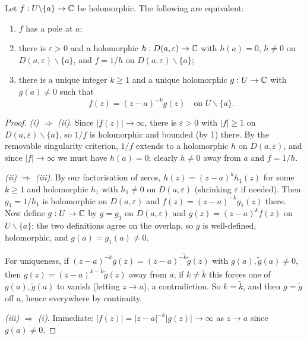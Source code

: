 \documentclass[a4paper]{scrartcl}
\begin{document}
\begin{proposition}
    Let $f: U \backslash \{a\} \rightarrow \mathbb{C}$ be holomorphic. The following are equivalent:
    \begin{enumerate}[label=(\roman*)]
        \item $f$ has a pole at $a$;
        \item there is $\varepsilon > 0$ and a holomorphic $h: D(a, \varepsilon) \rightarrow \mathbb{C}$ with $h(a) = 0$, $h \neq 0$ on $D(a, \varepsilon) \backslash \{a\}$, and $f = 1/h$ on $D(a, \varepsilon) \backslash \{a\}$;
        \item there is a unique integer $k \geq 1$ and a unique holomorphic $g: U \rightarrow \mathbb{C}$ with $g(a) \neq 0$ such that
        $$
        f(z) = (z - a)^{-k} g(z) \quad \text{on } U \backslash \{a\}.
        $$
    \end{enumerate}
\end{proposition}
\begin{proof}
    \emph{(i) $\Rightarrow$ (ii)}. Since $|f(z)| \rightarrow \infty$, there is $\varepsilon > 0$ with $|f| \geq 1$ on $D(a, \varepsilon)\backslash\{a\}$, so $1/f$ is holomorphic and bounded (by 1) there. By the removable singularity criterion, $1/f$ extends to a holomorphic $h$ on $D(a, \varepsilon)$, and since $|f| \rightarrow \infty$ we must have $h(a) = 0$; clearly $h \neq 0$ away from $a$ and $f = 1/h$.

    \emph{(ii) $\Rightarrow$ (iii)}. By our factorisation of zeros, $h(z) = (z - a)^k h_1(z)$ for some $k \geq 1$ and holomorphic $h_1$ with $h_1 \neq 0$ on $D(a, \varepsilon)$ (shrinking $\varepsilon$ if needed). Then $g_1 = 1/h_1$ is holomorphic on $D(a, \varepsilon)$ and $f(z) = (z - a)^{-k}g_1(z)$ there. Now define $g: U \rightarrow \mathbb{C}$ by $g = g_1$ on $D(a, \varepsilon)$ and $g(z) = (z - a)^k f(z)$ on $U \backslash \{a\}$; the two definitions agree on the overlap, so $g$ is well-defined, holomorphic, and $g(a) = g_1(a) \neq 0$.

    For uniqueness, if $(z - a)^{-k}g(z) = (z - a)^{-\tilde{k}}\tilde{g}(z)$ with $g(a), \tilde{g}(a) \neq 0$, then $g(z) = (z - a)^{k - \tilde{k}}\tilde{g}(z)$ away from $a$; if $k \neq \tilde{k}$ this forces one of $g(a), \tilde{g}(a)$ to vanish (letting $z \rightarrow a$), a contradiction. So $k = \tilde{k}$, and then $g = \tilde{g}$ off $a$, hence everywhere by continuity.

    \emph{(iii) $\Rightarrow$ (i)}. Immediate: $|f(z)| = |z - a|^{-k}|g(z)| \rightarrow \infty$ as $z \rightarrow a$ since $g(a) \neq 0$.
\end{proof}
\end{document}
